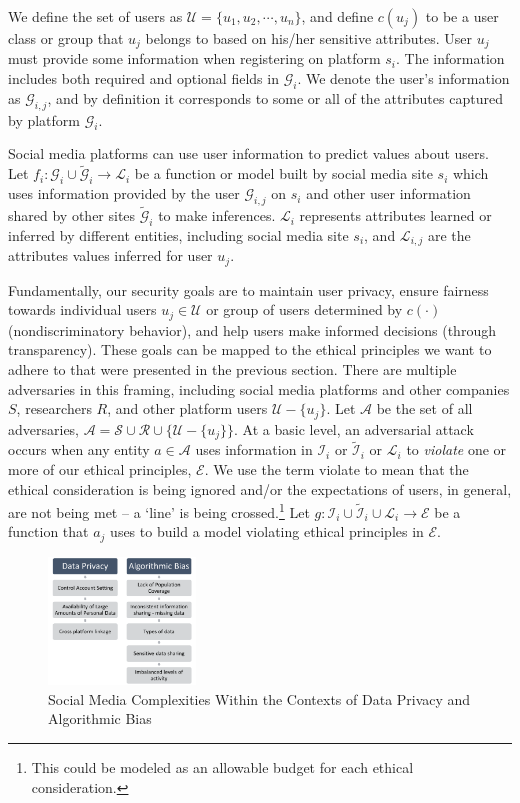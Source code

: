 \documentclass[11pt]{article} %
\begin{document}
We define the set of users as $\mathcal{U} = \{u_1, u_2, \cdots, u_n\}$, and define $c(u_j)$ to be a  user class or group that $u_j$ belongs to based on his/her sensitive attributes. User $u_j$ must provide some information when registering on platform $s_i$. The information includes both required and optional fields in  $\mathcal{G}_i$. We denote the user's information as $\mathcal{G}_{i,j}$, and by definition it corresponds to some or all of the attributes captured by platform $\mathcal{G}_i$. 

Social media platforms can use user information to predict values about users. Let $f_i:\mathcal{G}_i \cup \widetilde{\mathcal{G}}_i \rightarrow \mathcal{L}_i$ be a function or model built by social media site $s_i$ which uses information provided by the user $\mathcal{G}_{i,j}$ on $s_i$ and other user information shared by other sites $\widetilde{\mathcal{G}}_i$ to make inferences. $\mathcal{L}_i$ represents attributes learned or inferred by different entities, including social media site $s_i$, and $\mathcal{L}_{i,j}$ are the attributes values inferred for user $u_j$. 

Fundamentally, our security goals are to maintain user privacy, ensure fairness towards individual users $u_j \in \mathcal{U}$ or group of users determined by $c(\cdot)$ (nondiscriminatory behavior), and help users make informed decisions (through transparency). These goals can be mapped to the ethical principles we want to adhere to that were presented in the previous section. There are multiple adversaries in this framing, including social media platforms and other companies $S$, researchers $R$, and other platform users $\mathcal{U}-\{u_j\}$. Let $\mathcal{A}$ be the set of all adversaries, $\mathcal{A} = \mathcal{S} \cup \mathcal{R} \cup \{ \mathcal{U} - \{u_j\} \}$. At a basic level, an adversarial attack occurs when any entity $a \in \mathcal{A}$ uses information in $\mathcal{I}_i$ or $\widetilde{\mathcal{I}}_i$ or $\mathcal{L}_i$ to \textit{violate} one or more of our ethical principles, $\mathcal{E}$. We use the term violate to mean that the ethical consideration is being ignored and/or the expectations of users, in general, are not being met -- a `line' is being crossed.\footnote{This could be modeled as an allowable budget for each ethical consideration.} Let $g: \mathcal{I}_i \cup \widetilde{\mathcal{I}}_i \cup \mathcal{L}_i \rightarrow \mathcal{E}$ be a function that $a_j$ uses to build a model violating ethical principles in $\mathcal{E}$. 

\begin{figure}[tb]
    \centering
    \includegraphics[width=0.35\textwidth,natwidth=890,natheight=730]{figs/sm-challenges2.png}
    \caption{Social Media Complexities Within the Contexts of Data Privacy and Algorithmic Bias}
    \label{fig:framing}
\end{figure}
\end{document}
